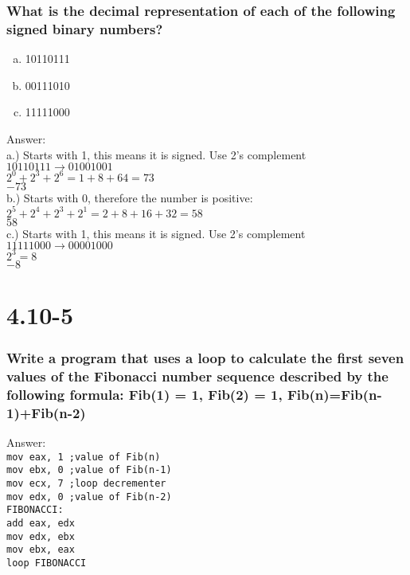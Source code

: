 \documentclass[12pt]{article}
\newcommand\tab[1][1cm]{\hspace*{#1}}
\begin{document}
\subsubsection*{What is the decimal representation of each of the following signed binary numbers?}
\begin{enumerate}[(a)]
	\item 10110111
	\item 00111010
	\item 11111000
\end{enumerate}
Answer: \\
a.) Starts with 1, this means it is signed. Use 2's complement\\
\tab \(10110111\rightarrow01001001\) \\
\tab \(2^0+2^3+2^6=1+8+64=73\) \\
\tab \(-73\) \\
b.) Starts with 0, therefore the number is positive:\\
\tab \(2^5+2^4+2^3+2^1=2+8+16+32=58\) \\
\tab \(58\) \\
c.) Starts with 1, this means it is signed. Use 2's complement\\
\tab \(11111000\rightarrow00001000\) \\
\tab \(2^3=8\) \\
\tab \(-8\) 
\section{4.10-5}
\subsubsection*{Write a program that uses a loop to calculate the first seven values of the Fibonacci number sequence described by the following formula: Fib(1) = 1, Fib(2) = 1, Fib(n)=Fib(n-1)+Fib(n-2)}
Answer: \\
\texttt{mov eax, 1 ;value of Fib(n) \\
	mov ebx, 0 ;value of Fib(n-1) \\
	mov ecx, 7 ;loop decrementer \\
	mov edx, 0 ;value of Fib(n-2) \\
	FIBONACCI: \\
	\tab add eax, edx \\
	\tab mov edx, ebx \\
	\tab mov ebx, eax \\
	\tab loop FIBONACCI}
\end{document}
